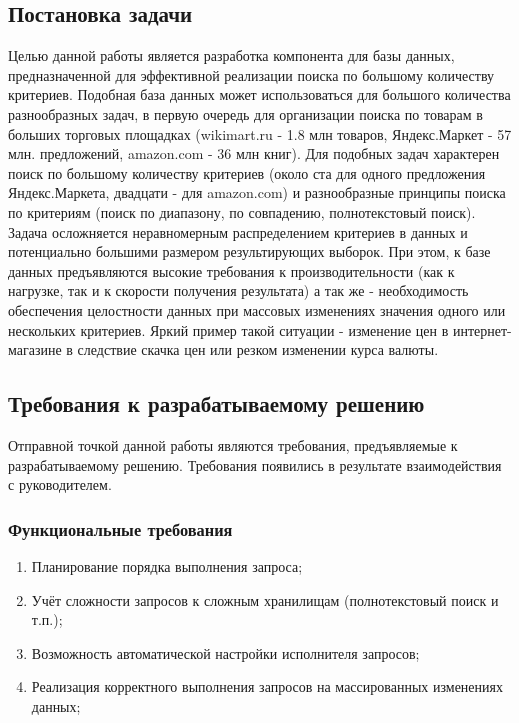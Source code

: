 \documentclass{matmex-diploma}
\begin{document}
    \subsection{Постановка задачи}
        Целью данной работы является разработка компонента для базы данных, предназначенной для эффективной реализации поиска по большому количеству критериев. Подобная база данных может использоваться для большого количества разнообразных задач, в первую очередь для организации поиска по товарам в больших торговых площадках (wikimart.ru - 1.8 млн товаров, Яндекс.Маркет - 57 млн. предложений, amazon.com - 36 млн книг). Для подобных задач характерен поиск по большому количеству критериев (около ста для одного предложения Яндекс.Маркета, двадцати - для amazon.com) и разнообразные принципы поиска по критериям (поиск по диапазону, по совпадению, полнотекстовый поиск). Задача осложняется неравномерным распределением критериев в данных и потенциально большими размером результирующих выборок. При этом, к базе данных предъявляются высокие требования к производительности (как к нагрузке, так и к скорости получения результата) а так же - необходимость обеспечения целостности данных при массовых изменениях значения одного или нескольких критериев. Яркий пример такой ситуации - изменение цен в интернет-магазине в следствие скачка цен или резком изменении курса валюты.
    \subsection{Требования к разрабатываемому решению}
        Отправной точкой данной работы являются требования, предъявляемые к разрабатываемому решению. Требования появились в результате взаимодействия с руководителем.
        \subsubsection{Функциональные требования}
            \begin{enumerate}
                \item Планирование порядка выполнения запроса;
                \item Учёт сложности запросов к сложным хранилищам (полнотекстовый поиск и т.п.);
                \item Возможность автоматической настройки исполнителя запросов;
                \item Реализация корректного выполнения запросов на массированных изменениях данных;
            \end{enumerate}
\end{document}
